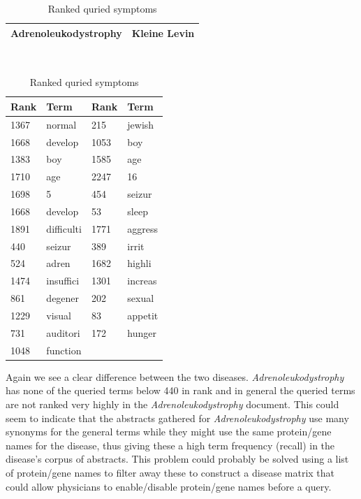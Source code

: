 \begin{table}[H]
\begin{tiny}
\caption{Ranked quried symptoms}
\label{termranked}
 \begin{center}
  \begin{tabular}{|p{6cm}|p{6cm}|}
    \hline
    \scriptsize{\textbf{Adrenoleukodystrophy}} & \scriptsize{\textbf{Kleine Levin}} \\
  \hline
  \end{tabular}
  \\
\begin{tabular}{|p{2.8cm}|p{2.8cm}|p{2.8cm}|p{2.8cm}|}
\hline
 \scriptsize{\textbf{Rank}} & \scriptsize{\textbf{Term}} & \scriptsize{\textbf{Rank}} & \scriptsize{\textbf{Term}} \\
\hline
  1367 & normal & 215 & jewish \\
\hline
   1668 & develop  &  1053 & boy \\
\hline
  1383 & boy  & 1585 & age \\
\hline
  1710 & age & 2247 & 16 \\
\hline
  1698 & 5 &  454 & seizur \\
\hline
  1668 & develop &  53 & sleep \\
\hline
  1891 & difficulti &  1771 & aggress \\
\hline
  440 & seizur &  389 & irrit \\
\hline
  524 & adren  & 1682 & highli \\
\hline
  1474 & insuffici &  1301 & increas \\
\hline
  861 & degener  & 202 & sexual \\
\hline
  1229 & visual &  83 & appetit \\
\hline
  731 & auditori &  172 & hunger \\
\hline
  1048 & function & & \\
\hline
\end{tabular}
\end{center}
\end{tiny}
\end{table}

Again we see a clear difference between the two diseases. \textit{Adrenoleukodystrophy}
has none of the queried terms below 440 in rank and in general the queried terms are not
ranked very highly in the \textit{Adrenoleukodystrophy} document. This could seem to indicate
that the abstracts gathered for \textit{Adrenoleukodystrophy} use many synonyms for the
general terms while they might use the same protein/gene names for the disease, thus giving
these a high term frequency (recall) in the disease's corpus of abstracts. This problem
could probably be solved using a list of protein/gene names to filter away these to construct
a disease matrix that could allow physicians to enable/disable protein/gene names before a 
query.

